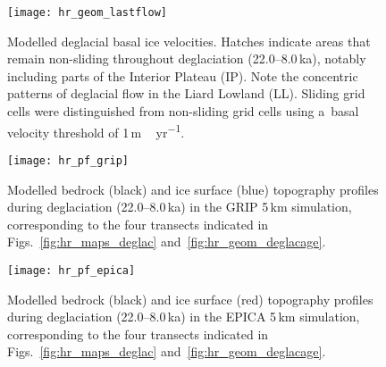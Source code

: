 \documentclass[tc, manuscript]{copernicus}
\begin{document}
\begin{figure*}%
\texttt{[image: hr\_geom\_lastflow]}
\caption{%
      Modelled deglacial basal ice velocities. Hatches indicate areas that
      remain non-sliding throughout deglaciation (22.0--8.0\,\unit{ka}),
      notably including parts of the Interior Plateau (IP). Note the
      concentric patterns of deglacial flow in the Liard Lowland (LL).
      Sliding grid cells were distinguished from non-sliding grid cells
      using a~basal velocity threshold of 1\,\unit{m\,yr^{-1}}.}
\label{fig:hr_geom_lastflow}%
\end{figure*}%


\begin{figure}%
\texttt{[image: hr\_pf\_grip]}
\caption{%
      Modelled bedrock (black) and ice surface (blue) topography profiles
      during deglaciation (22.0--8.0\,\unit{ka}) in the GRIP 5\,\unit{km}
      simulation, corresponding to the four transects indicated in
      Figs.~\ref{fig:hr_maps_deglac}
      and~\ref{fig:hr_geom_deglacage}.}
\label{fig:hr_pf_grip}%
\end{figure}%


\begin{figure}%
\texttt{[image: hr\_pf\_epica]}
\caption{%
      Modelled bedrock (black) and ice surface (red) topography profiles
      during deglaciation (22.0--8.0\,\unit{ka}) in the EPICA 5\,\unit{km}
      simulation, corresponding to the four transects indicated in
      Figs.~\ref{fig:hr_maps_deglac}
      and~\ref{fig:hr_geom_deglacage}.}
\label{fig:hr_pf_epica}%
\end{figure}
\end{document}
